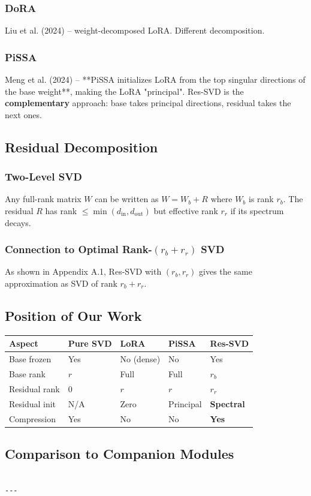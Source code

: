 \subsubsection{DoRA}

Liu et al. (2024) -- weight-decomposed LoRA. Different decomposition.

\subsubsection{PiSSA}

Meng et al. (2024) -- **PiSSA initializes LoRA from the top singular 
directions of the base weight**, making the LoRA "principal". Res-SVD is 
the \textbf{complementary} approach: base takes principal directions, residual 
takes the next ones.

\subsection{Residual Decomposition}

\subsubsection{Two-Level SVD}

Any full-rank matrix $W$ can be written as $W = W_b + R$ where $W_b$ is 
rank $r_b$. The residual $R$ has rank $\leq \min(d_\text{in}, d_\text{out})$ 
but effective rank $r_r$ if its spectrum decays.

\subsubsection{Connection to Optimal Rank-$(r_b + r_r)$ SVD}

As shown in Appendix A.1, Res-SVD with $(r_b, r_r)$ gives the same 
approximation as SVD of rank $r_b + r_r$.

\subsection{Position of Our Work}

\begin{table}[H]
\centering
\small
\begin{tabular}{lllll}
\toprule
\textbf{Aspect} & \textbf{Pure SVD} & \textbf{LoRA} & \textbf{PiSSA} & \textbf{Res-SVD} \\
\midrule
Base frozen & Yes & No (dense) & No & Yes \\
Base rank & $r$ & Full & Full & $r_b$ \\
Residual rank & 0 & $r$ & $r$ & $r_r$ \\
Residual init & N/A & Zero & Principal & \textbf{Spectral} \\
Compression & Yes & No & No & \textbf{Yes} \\
\bottomrule
\end{tabular}
\end{table}

\subsection{Comparison to Companion Modules}

\begin{lstlisting}

---
\end{lstlisting}
